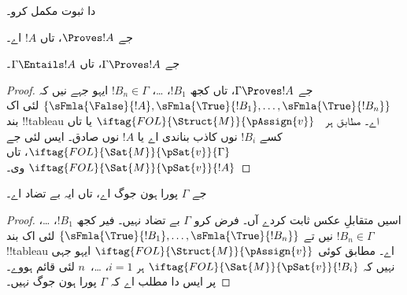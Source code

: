 \documentclass[../../../include/open-logic-section]{subfiles}
\begin{document}
\begin{prob}
 دا ثبوت مکمل کرو۔
\end{prob}
\tagendprob

\begin{cor}
جے $\Proves !A$، تاں $!A$  اے۔
\end{cor}

\begin{cor}
جے $\Gamma \Proves !A$، تاں $\Gamma \Entails !A$۔
\end{cor}

\begin{proof}
  جے $\Gamma \Proves !A$، تاں کجھ $!B_1$، \dots، $!B_n \in
  \Gamma$ ایہو جہے نیں کہ
  $\{\sFmla{\False}{!A}, \sFmla{\True}{!B_1}, \dots,
  \sFmla{\True}{!B_n}\}$ لئی اک بند !!{tableau} اے۔
   مطابق ہر
  ~$\iftag{FOL}{\Struct{M}}{\pAssign{v}}$
  یا تاں کسے $!B_i$ نوں کاذب بناندی اے یا $!A$ نوں صادق۔
  ایس لئی جے $\iftag{FOL}{\Sat{M}}{\pSat{v}}{\Gamma}$، تاں
  $\iftag{FOL}{\Sat{M}}{\pSat{v}}{!A}$ وی۔
\end{proof}

\begin{cor}
جے $\Gamma$ پورا ہون جوگ اے، تاں ایہ بے تضاد اے۔
\end{cor}

\begin{proof}
اسیں متقابلِ عکس ثابت کردے آں۔ فرض کرو $\Gamma$ بے تضاد نہیں۔
فیر کجھ $!B_1$، \dots، $!B_n \in \Gamma$ نیں تے
$\{\sFmla{\True}{!B_1}, \dots, \sFmla{\True}{!B_n}\}$ لئی
اک بند !!{tableau} اے۔  مطابق کوئی
$\iftag{FOL}{\Struct{M}}{\pAssign{v}}$ ایہو جہی نہیں کہ
$\iftag{FOL}{\Sat{M}}{\pSat{v}}{!B_i}$ ہر
$i=1$، \dots،~$n$ لئی قائم ہووے۔ پر ایس دا
مطلب اے کہ $\Gamma$ پورا ہون جوگ نہیں۔
\end{proof}
\end{document}
